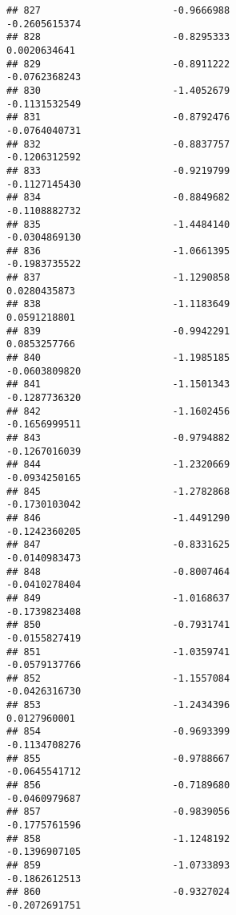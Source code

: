 \documentclass[
]{article}
\begin{document}
\begin{verbatim}
## 827                       -0.9666988                         -0.2605615374
## 828                       -0.8295333                          0.0020634641
## 829                       -0.8911222                         -0.0762368243
## 830                       -1.4052679                         -0.1131532549
## 831                       -0.8792476                         -0.0764040731
## 832                       -0.8837757                         -0.1206312592
## 833                       -0.9219799                         -0.1127145430
## 834                       -0.8849682                         -0.1108882732
## 835                       -1.4484140                         -0.0304869130
## 836                       -1.0661395                         -0.1983735522
## 837                       -1.1290858                          0.0280435873
## 838                       -1.1183649                          0.0591218801
## 839                       -0.9942291                          0.0853257766
## 840                       -1.1985185                         -0.0603809820
## 841                       -1.1501343                         -0.1287736320
## 842                       -1.1602456                         -0.1656999511
## 843                       -0.9794882                         -0.1267016039
## 844                       -1.2320669                         -0.0934250165
## 845                       -1.2782868                         -0.1730103042
## 846                       -1.4491290                         -0.1242360205
## 847                       -0.8331625                         -0.0140983473
## 848                       -0.8007464                         -0.0410278404
## 849                       -1.0168637                         -0.1739823408
## 850                       -0.7931741                         -0.0155827419
## 851                       -1.0359741                         -0.0579137766
## 852                       -1.1557084                         -0.0426316730
## 853                       -1.2434396                          0.0127960001
## 854                       -0.9693399                         -0.1134708276
## 855                       -0.9788667                         -0.0645541712
## 856                       -0.7189680                         -0.0460979687
## 857                       -0.9839056                         -0.1775761596
## 858                       -1.1248192                         -0.1396907105
## 859                       -1.0733893                         -0.1862612513
## 860                       -0.9327024                         -0.2072691751

\end{verbatim}
\end{document}
